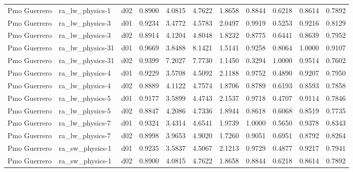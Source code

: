 \begin{longtable}{lllrrrrrrrr}
         Pmo Guerrero  &       ra\_lw\_physics-1 &     d02 &   0.8900 &   4.0815 &   4.7622 &       1.8658 &        0.8844 &       0.6218 &           0.8614 &  0.7892 \\
         Pmo Guerrero  &       ra\_lw\_physics-3 &     d01 &   0.9234 &   3.4772 &   4.5783 &       2.0497 &        0.9919 &       0.5253 &           0.9216 &  0.8129 \\
         Pmo Guerrero  &       ra\_lw\_physics-3 &     d02 &   0.8914 &   4.1204 &   4.8048 &       1.8232 &        0.8775 &       0.6441 &           0.8639 &  0.7952 \\
         Pmo Guerrero  &      ra\_lw\_physics-31 &     d01 &   0.9669 &   3.8488 &   8.1421 &       1.5141 &        0.9258 &       0.8064 &           1.0000 &  0.9107 \\
         Pmo Guerrero  &      ra\_lw\_physics-31 &     d02 &   0.9399 &   7.2027 &   7.7730 &       1.1450 &        0.3294 &       1.0000 &           0.9514 &  0.7602 \\
         Pmo Guerrero  &       ra\_lw\_physics-4 &     d01 &   0.9229 &   3.5708 &   4.5092 &       2.1188 &        0.9752 &       0.4890 &           0.9207 &  0.7950 \\
         Pmo Guerrero  &       ra\_lw\_physics-4 &     d02 &   0.8889 &   4.1122 &   4.7574 &       1.8706 &        0.8789 &       0.6193 &           0.8593 &  0.7858 \\
         Pmo Guerrero  &       ra\_lw\_physics-5 &     d01 &   0.9177 &   3.5899 &   4.4743 &       2.1537 &        0.9718 &       0.4707 &           0.9114 &  0.7846 \\
         Pmo Guerrero  &       ra\_lw\_physics-5 &     d02 &   0.8847 &   4.2086 &   4.7336 &       1.8944 &        0.8618 &       0.6068 &           0.8519 &  0.7735 \\
         Pmo Guerrero  &       ra\_lw\_physics-7 &     d01 &   0.9324 &   3.4314 &   4.6541 &       1.9739 &        1.0000 &       0.5650 &           0.9378 &  0.8343 \\
         Pmo Guerrero  &       ra\_lw\_physics-7 &     d02 &   0.8998 &   3.9653 &   4.9020 &       1.7260 &        0.9051 &       0.6951 &           0.8792 &  0.8264 \\
         Pmo Guerrero  &       ra\_sw\_physics-1 &     d01 &   0.9235 &   3.5837 &   4.5067 &       2.1213 &        0.9729 &       0.4877 &           0.9217 &  0.7941 \\
         Pmo Guerrero  &       ra\_sw\_physics-1 &     d02 &   0.8900 &   4.0815 &   4.7622 &       1.8658 &        0.8844 &       0.6218 &           0.8614 &  0.7892 \\

\end{longtable}
